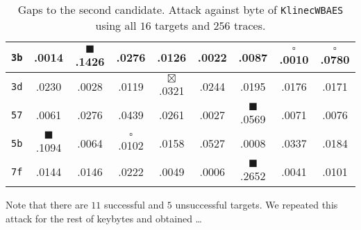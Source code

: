 \begin{table}[h]
\begin{center}
\begin{tabular}{| c | c | c | c | c | c | c | c | c |}
		\hline
		{\tt 3b}&\quad .0014&$\blacksquare$ .1426&\quad .0276&\quad .0126&\quad .0022&\quad .0087&$\square$ .0010&$\square$ .0780 \\
		\hline
		{\tt 3d}&\quad .0230&\quad .0028&\quad .0119&$\boxtimes$ .0321&\quad .0244&\quad .0195&\quad .0176&\quad .0171 \\
		\hline
		{\tt 57}&\quad .0061&\quad .0276&\quad .0439&\quad .0261&\quad .0027&$\blacksquare$ .0569&\quad .0071&\quad .0076 \\
		\hline
		{\tt 5b}&$\blacksquare$ .1094&\quad .0064&$\square$ .0102&\quad .0158&\quad .0527&\quad .0008&\quad .0337&\quad .0184 \\
		\hline
		{\tt 7f}&\quad .0144&\quad .0146&\quad .0222&\quad .0049&\quad .0006&$\blacksquare$ .2652&\quad .0041&\quad .0101 \\
		\hline
	\end{tabular}
	\end{center}
\caption{Gaps to the second candidate. Attack against  byte of {\tt KlinecWBAES} using all $16$ targets and $256$ traces.}
\label{tab:lintargets}
\end{table}

Note that there are $11$ successful and $5$ unsuccessful targets. We repeated this attack for the rest of keybytes and obtained \ldots




